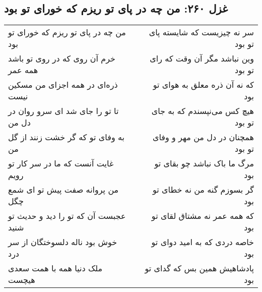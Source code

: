 \begin{center}
\section*{غزل ۲۶۰: من چه در پای تو ریزم که خورای تو بود}
\label{sec:260}
\begin{longtable}{l p{0.5cm} r}
من چه در پای تو ریزم که خورای تو بود
&&
سر نه چیزیست که شایسته پای تو بود
\\
خرم آن روی که در روی تو باشد همه عمر
&&
وین نباشد مگر آن وقت که رای تو بود
\\
ذره‌ای در همه اجزای من مسکین نیست
&&
که نه آن ذره معلق به هوای تو بود
\\
تا تو را جای شد ای سرو روان در دل من
&&
هیچ کس می‌نپسندم که به جای تو بود
\\
به وفای تو که گر خشت زنند از گل من
&&
همچنان در دل من مهر و وفای تو بود
\\
غایت آنست که ما در سر کار تو رویم
&&
مرگ ما باک نباشد چو بقای تو بود
\\
من پروانه صفت پیش تو ای شمع چگل
&&
گر بسوزم گنه من نه خطای تو بود
\\
عجبست آن که تو را دید و حدیث تو شنید
&&
که همه عمر نه مشتاق لقای تو بود
\\
خوش بود ناله دلسوختگان از سر درد
&&
خاصه دردی که به امید دوای تو بود
\\
ملک دنیا همه با همت سعدی هیچست
&&
پادشاهیش همین بس که گدای تو بود
\\
\end{longtable}
\end{center}
